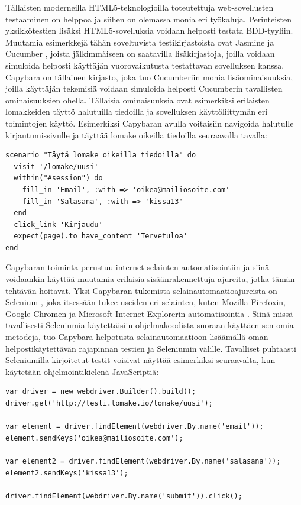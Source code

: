 \documentclass[finnish,nonumbib,nocopyright]{gradu2}
\begin{document}
Tällaisten moderneilla HTML5-teknologioilla toteutettuja web-sovellusten testaaminen on helppoa ja siihen on olemassa monia eri työkaluja. Perinteisten yksikkötestien lisäksi HTML5-sovelluksia voidaan helposti testata BDD-tyyliin. Muutamia esimerkkejä tähän soveltuvista testikirjastoista ovat Jasmine \cite{jasmine} ja Cucumber \cite{cucumber}, joista jälkimmäiseen on saatavilla lisäkirjastoja, joilla voidaan simuloida helposti käyttäjän vuorovaikutusta testattavan sovelluksen kanssa. Capybara \cite{capybara} on tällainen kirjasto, joka tuo Cucumberiin monia lisäominaisuuksia, joilla käyttäjän tekemisiä voidaan simuloida helposti Cucumberin tavallisten ominaisuuksien ohella. Tällaisia ominaisuuksia ovat esimerkiksi erilaisten lomakkeiden täyttö halutuilla tiedoilla ja sovelluksen käyttöliittymän eri toimintojen käyttö. Esimerkiksi Capybaran avulla voitaisiin navigoida halutulle kirjautumissivulle ja täyttää lomake oikeilla tiedoilla seuraavalla tavalla:
\begin{verbatim}
scenario "Täytä lomake oikeilla tiedoilla" do
  visit '/lomake/uusi'
  within("#session") do
    fill_in 'Email', :with => 'oikea@mailiosoite.com'
    fill_in 'Salasana', :with => 'kissa13'
  end
  click_link 'Kirjaudu'
  expect(page).to have_content 'Tervetuloa'
end
\end{verbatim}
Capybaran toiminta perustuu internet-selainten automatisointiin ja siinä voidaankin käyttää muutamia erilaisia sisäänrakennettuja ajureita, jotka tämän tehtävän hoitavat. Yksi Capybaran tukemista selainautomaatioajureista on Selenium \cite{selenium}, joka itsessään tukee useiden eri selainten, kuten Mozilla Firefoxin, Google Chromen ja Microsoft Internet Explorerin automatisointia \cite{selenium}. Siinä missä tavallisesti Seleniumia käytettäisiin ohjelmakoodista suoraan käyttäen sen omia metodeja, tuo Capybara helpotusta selainautomaatioon lisäämällä oman helpostikäytettävän rajapinnan testien ja Seleniumin välille. Tavalliset puhtaasti Seleniumilla kirjoitetut testit voisivat näyttää esimerkiksi seuraavalta, kun käytetään ohjelmointikielenä JavaScriptiä:
\begin{verbatim}
var driver = new webdriver.Builder().build();
driver.get('http://testi.lomake.io/lomake/uusi');

var element = driver.findElement(webdriver.By.name('email'));
element.sendKeys('oikea@mailiosoite.com');

var element2 = driver.findElement(webdriver.By.name('salasana'));
element2.sendKeys('kissa13');

driver.findElement(webdriver.By.name('submit')).click();
\end{verbatim}
\end{document}

